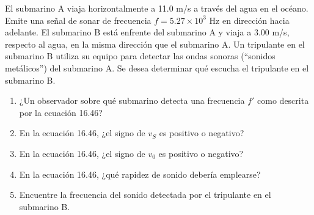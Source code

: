 \item El submarino A viaja horizontalmente a 11.0 m/s a través del agua en el océano. Emite una señal de sonar de frecuencia $f = 5.27 \times 10^3\text{ Hz}$ en dirección hacia adelante. El submarino B está enfrente del submarino A y viaja a 3.00 m/s, respecto al agua, en la misma dirección que el submarino A. Un tripulante en el submarino B utiliza su equipo para detectar las ondas sonoras (“sonidos metálicos”) del submarino A. Se desea determinar qué escucha el tripulante en el submarino B.
\begin{enumerate}
    \item ¿Un observador sobre qué submarino detecta una frecuencia $f'$ como descrita por la ecuación 16.46?
    \item En la ecuación 16.46, ¿el signo de $v_S$ es positivo o negativo?
    \item En la ecuación 16.46, ¿el signo de $v_0$ es positivo o negativo?
    \item En la ecuación 16.46, ¿qué rapidez de sonido debería emplearse?
    \item Encuentre la frecuencia del sonido detectada por el tripulante en el submarino B.
\end{enumerate}